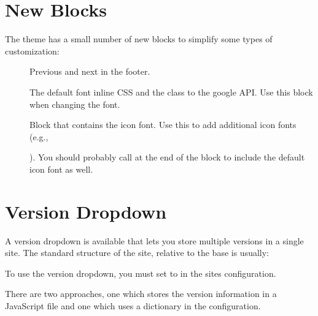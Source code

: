 \documentclass[letterpaper,10pt,english]{sphinxmanual}
\begin{document}
\section{New Blocks}
\label{\detokenize{customization:new-blocks}}
The theme has a small number of new blocks to simplify some types of
customization:
\begin{description}
\item[{}] \leavevmode
Previous and next in the footer.

\item[{}] \leavevmode
The default font inline CSS and the class to the google API. Use this
block when changing the font.

\item[{}] \leavevmode
Block that contains the icon font. Use this to add additional icon fonts
(e.g., %
\begin{footnote}[3]\sphinxAtStartFootnote
{}
%
\end{footnote}). You should probably call  at
the end of the block to include the default icon font as well.

\end{description}


\section{Version Dropdown}
\label{\detokenize{customization:version-dropdown}}
A version dropdown is available that lets you store multiple versions in a single site.
The standard structure of the site, relative to the base is usually:

\begin{sphinxVerbatim}[commandchars=\\\{\}]
\end{sphinxVerbatim}

To use the version dropdown, you must set  to  in
the sites configuration.

There are two approaches, one which stores the version information in a JavaScript file
and one which uses a dictionary in the configuration.
\end{document}
